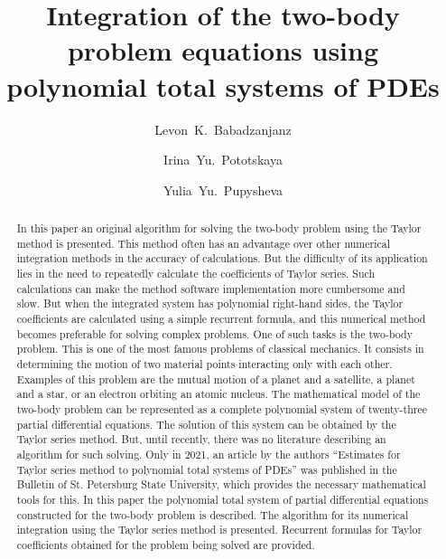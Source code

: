 \begin{englishtitle} %
\title{Integration of the two-body problem equations using  polynomial total systems of PDEs}
\author{Levon~K.~Babadzanjanz   \and  Irina~Yu.~Pototskaya   \and  Yulia~Yu.~Pupysheva
}

\maketitle

\begin{abstract}
In this paper an original algorithm for solving the two-body problem using the Taylor method is presented. This method often has an advantage over other numerical integration methods in the accuracy of calculations. But the difficulty of its application lies in the need to repeatedly calculate the coefficients of Taylor series. Such calculations can make the method software implementation more cumbersome and slow. But when the integrated system has polynomial right-hand sides, the Taylor coefficients are calculated using a simple recurrent formula, and this numerical method becomes preferable for solving complex problems.
One of such tasks is the two-body problem. This is one of the most famous problems of classical mechanics. It consists in determining the motion of two material points interacting only with each other. Examples of this problem are the mutual motion of a planet and a satellite, a planet and a star, or an electron orbiting an atomic nucleus. The mathematical model of the two-body problem can be represented as a complete polynomial system of twenty-three partial differential equations. The solution of this system can be obtained by the Taylor series method. But, until recently, there was no literature describing an algorithm for such solving. Only in 2021, an article by the authors ``Estimates for Taylor series method to polynomial total systems of PDEs'' was published in the Bulletin of St. Petersburg State University, which provides the necessary mathematical tools for this.
In this paper the polynomial total system of partial differential equations constructed for the two-body problem is described. The algorithm for its numerical integration using the Taylor series method is presented. Recurrent formulas for Taylor coefficients obtained for the problem being solved are provided.


\end{abstract}
\end{englishtitle}

